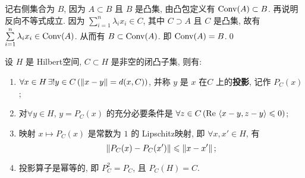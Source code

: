 	\begin{Proof}
		记右侧集合为 $ B $, 因为 $ A\subset B $ 且 $ B $ 是凸集, 由凸包定义有 $ \operatorname{Conv}(A)\subset B $. 再说明反向不等式成立. 因为 $ \sum\limits_{i=1}^{n}\lambda_{i}x_{i}\in C $, 其中 $ C\supset A $ 且 $ C $ 是凸集, 故有 $ \sum\limits_{i=1}^{n}\lambda_{i}x_{i}\in\operatorname{Conv}(A) $. 从而有 $ B\subset\operatorname{Conv}(A) $. 即 $ \operatorname{Conv}(A)=B $.\qed
	\end{Proof}

	\begin{Theorem}[闭凸集投影定理]\label{thm:闭凸集投影定理}
		设 $ H $ 是 Hilbert空间, $ C\subset H $ 是非空的闭凸子集, 则有:
		\begin{enumerate}[(1)]
			\item $ \forall x\in H\,\exists!y\in C\,(\left\| x-y \right\|=d(x, C)) $, 并称 $ y $ 是 $ x $ 在$ C $ 上的\textbf{投影}, 记作 $ P_{C}(x) $;
			\item 对$ \forall y\in H $, $ y=P_{C}(x) $ 的充分必要条件是 $ \forall z\in C\,(\mathrm{Re\,}\left\langle x-y, z-y \right\rangle\leqslant0) $;
			\item 映射 $ x\mapsto P_{C}(x) $ 是常数为 $ 1 $ 的 Lipschitz映射, 即 $ \forall x, x'\in H $, 有
			\[
				\left\| P_{C}(x)-P_{C}(x') \right\|\leqslant \left\| x-x' \right\|;
			\]
			\item 投影算子是幂等的, 即 $ P^{2}_{C}=P_{C} $, 且 $ P_{C}(H)=C $. 
		\end{enumerate}
	\end{Theorem}
	
